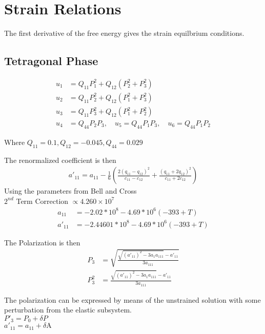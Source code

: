 \documentclass{article}
\begin{document}
\section{Strain Relations}
\label{sec:Strain}
The first derivative of the free energy gives the strain equilbrium conditions.

\subsection{Tetragonal Phase}
\begin{align}
u_1 &= Q_{11} P_1^2 + Q_{12}(P_2^2 + P_3^2) \\
u_2 &= Q_{11} P_2^2 + Q_{12}(P_1^2 + P_3^2) \\
u_3 &= Q_{11} P_3^2 + Q_{12}(P_1^2 + P_2^2) \\
u_4 &= Q_{44}P_2P_3, \quad u_5=  Q_{44}P_1P_3, \quad u_6=  Q_{44}P_1P_2
\end{align}

Where $Q_{11}=0.1 , Q_{12}=-0.045 , Q_{44}=0.029$

The renormalized coefficient is then
\begin{align}
a'_{11}=a_{11}-\frac{1}{6} \left(\frac{2 (q_{11}-q_{12})^2}{c_{11}-c_{12}}+\frac{(q_{11}+2 q_{12})^2}{c_{11}+2 c_{12}}\right)
\end{align}
Using the parameters from Bell and Cross \\

 \indent \indent \indent \indent $2^{nd}$ Term Correction $\propto 4.260 \times 10^7 $
\begin{align}
a_{11}&=-2.02*10^8 - 4.69*10^6 (-393 + T) \\
a'_{11}&=-2.44601*10^8 - 4.69*10^6 (-393 + T)
\end{align}

The Polarization is then
\begin{align}
P_3&=\sqrt{\frac{\sqrt{(a'_{11})^2-3 a_1 a_{111}}-a'_{11}}{3a_{111}}} \\
P_3^2 &=\frac{\sqrt{(a'_{11})^2-3 a_1 a_{111}}-a'_{11}}{3a_{111}}
\end{align}

The polarization can be expressed by means of the unstrained solution with some perturbation from the elastic subsystem. \\
\center $P'_3=P_0+\delta P$ \\
\center $a'_{11}=a_{11}+\delta \text{A}$ \\
\end{document}
